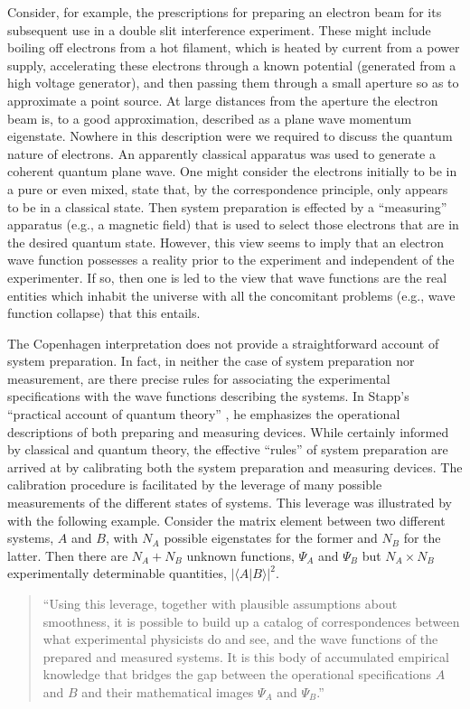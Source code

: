 \documentclass [12pt]{revtex4}
\begin{document}
Consider, for example, the prescriptions for preparing an electron
beam for its subsequent use in a double slit interference experiment.
These might include boiling off electrons from a hot filament, which is
heated by current from a power supply, accelerating these
electrons through a known potential (generated from a high voltage generator),
and then passing them through a small aperture so as to approximate a point
source. At large distances from the aperture the electron beam is,
to a good approximation, described as a plane wave momentum
eigenstate. Nowhere in this description were
we required to discuss the quantum nature of electrons. An
apparently classical apparatus was used to
generate a coherent quantum plane wave. One might
consider the electrons initially to be in a pure or even mixed,
state that, by the correspondence principle, only appears to be in a
classical state.  Then system preparation is effected by a
``measuring'' apparatus (e.g., a magnetic field) that is used to select
those electrons that are in the desired
quantum state. However, this view seems to imply that an electron
wave function possesses a reality prior to the experiment and
independent of the experimenter.  If so, then one is led to the view
that wave functions are the real entities which inhabit the universe
with all the concomitant problems (e.g., wave function collapse)
that this entails.

The Copenhagen interpretation does not provide a
straightforward account of system preparation.
In fact, in neither the case of system preparation nor measurement,
are there precise rules for associating the experimental
specifications with the wave functions describing the systems.
In Stapp's ``practical account of quantum theory'' \cite{S1972}, he
emphasizes the operational descriptions of both preparing and
measuring devices. While certainly informed by classical and quantum
theory, the effective ``rules'' of system preparation are arrived at
by calibrating both the system preparation and measuring devices.  The
calibration procedure is facilitated by the leverage of many possible
measurements of the different states of systems.  This leverage was
illustrated by \cite{S1972} with the following example.  Consider
the matrix element between two different systems, $A$
and $B$, with $N_A$ possible eigenstates for the former and $N_B$ for
the latter. Then there are $N_A+ N_B$ unknown functions, $\Psi_A$ and
$\Psi_B$ but $N_A \times N_B$ experimentally determinable quantities,
$| \langle A|B \rangle |^2$.
\begin{quote}
``Using this leverage, together with plausible assumptions about
smoothness, it is possible  to build up a catalog of correspondences
between what experimental physicists do and see, and the wave
functions of the prepared and measured systems.  It is this body of
accumulated empirical knowledge that bridges the gap between the
operational specifications $A$ and $B$ and their mathematical images
$\Psi_A$ and $\Psi_B$.''
\end{quote}
\end{document}
